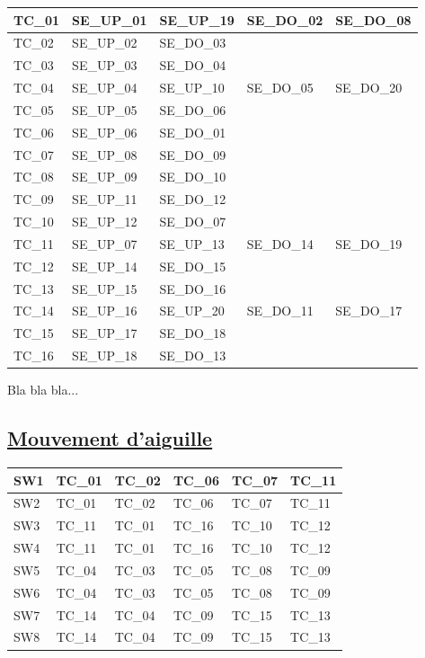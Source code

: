 \begin{center}
\begin{tabular}{|l||llll|}
  \hline
  TC\_01 & SE\_UP\_01 & SE\_UP\_19 & SE\_DO\_02 & SE\_DO\_08 \\
  \hline
  TC\_02 & SE\_UP\_02 & SE\_DO\_03 & & \\
  \hline
  TC\_03 & SE\_UP\_03 & SE\_DO\_04 & & \\
  \hline
  TC\_04 & SE\_UP\_04 & SE\_UP\_10 & SE\_DO\_05 & SE\_DO\_20 \\
  \hline
  TC\_05 & SE\_UP\_05 & SE\_DO\_06 & & \\
  \hline
  TC\_06 & SE\_UP\_06 & SE\_DO\_01 & & \\
  \hline
  TC\_07 & SE\_UP\_08 & SE\_DO\_09 & & \\
  \hline
  TC\_08 & SE\_UP\_09 & SE\_DO\_10 & & \\
  \hline
  TC\_09 & SE\_UP\_11 & SE\_DO\_12 & & \\
  \hline
  TC\_10 & SE\_UP\_12 & SE\_DO\_07 & & \\
  \hline
  TC\_11 & SE\_UP\_07 & SE\_UP\_13 & SE\_DO\_14 & SE\_DO\_19 \\
  \hline
  TC\_12 & SE\_UP\_14 & SE\_DO\_15 & & \\
  \hline
  TC\_13 & SE\_UP\_15 & SE\_DO\_16 & & \\
  \hline
  TC\_14 & SE\_UP\_16 & SE\_UP\_20 & SE\_DO\_11 & SE\_DO\_17 \\
  \hline
  TC\_15 & SE\_UP\_17 & SE\_DO\_18 & & \\
  \hline
  TC\_16 & SE\_UP\_18 & SE\_DO\_13 & & \\
  \hline
\end{tabular}
\end{center}


Bla bla bla...

\subsection{\underline{Mouvement d'aiguille}}
\label{sec:mvt_aig}



\begin{center}
\begin{tabular}{|l||lllll|}
  \hline
  SW1 & TC\_01 & TC\_02 & TC\_06 & TC\_07 & TC\_11 \\
  \hline
  SW2 & TC\_01 & TC\_02 & TC\_06 & TC\_07 & TC\_11 \\
  \hline
  SW3 & TC\_11 & TC\_01 & TC\_16 & TC\_10 & TC\_12 \\
  \hline
  SW4 & TC\_11 & TC\_01 & TC\_16 & TC\_10 & TC\_12 \\
  \hline
  SW5 & TC\_04 & TC\_03 & TC\_05 & TC\_08 & TC\_09 \\
  \hline
  SW6 & TC\_04 & TC\_03 & TC\_05 & TC\_08 & TC\_09 \\
  \hline
  SW7 & TC\_14 & TC\_04 & TC\_09 & TC\_15 & TC\_13 \\
  \hline
  SW8 & TC\_14 & TC\_04 & TC\_09 & TC\_15 & TC\_13 \\
  \hline
\end{tabular}
\end{center}





\newpage





